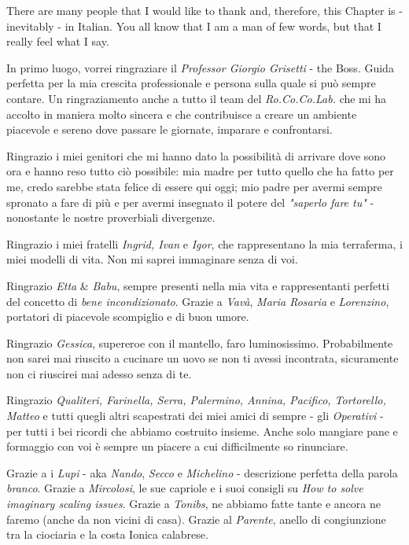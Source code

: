 \newpage

\begin{acknowledgements}
    There are many people that I would like to thank and, therefore, this Chapter is - inevitably - in Italian. You all know that I am a man of few words, but that I really feel what I say.
    
    \vspace{15px}
    
    In primo luogo, vorrei ringraziare il \textit{Professor Giorgio Grisetti} - the Boss. Guida perfetta per la mia crescita professionale e persona sulla quale si può sempre contare. Un ringraziamento anche a tutto il team del \textit{Ro.Co.Co.Lab.} che mi ha accolto in maniera molto sincera e che contribuisce a creare un ambiente piacevole e sereno dove passare le giornate, imparare e confrontarsi.
    
    Ringrazio i miei genitori che mi hanno dato la possibilità di arrivare dove sono ora e hanno reso tutto ciò possibile: mia madre per tutto quello che ha fatto per me, credo sarebbe stata felice di essere qui oggi; mio padre per avermi sempre spronato a fare di più e per avermi insegnato il potere del \textit{"saperlo fare tu"} - nonostante le nostre proverbiali divergenze.
    
    Ringrazio i miei fratelli \textit{Ingrid, Ivan} e \textit{Igor}, che rappresentano la mia terraferma, i miei modelli di vita. Non mi saprei immaginare senza di voi.
    
    Ringrazio \textit{Etta} \& \textit{Babu}, sempre presenti nella mia vita e rappresentanti perfetti del concetto di \textit{bene incondizionato}. Grazie a \textit{Vavà}, \textit{Maria Rosaria} e \textit{Lorenzino}, portatori di piacevole scompiglio e di buon umore. 
    
    Ringrazio \textit{Gessica}, supereroe con il mantello, faro luminosissimo. Probabilmente non sarei mai riuscito a cucinare un uovo se non ti avessi incontrata, sicuramente non ci riuscirei mai adesso senza di te.
    
    Ringrazio \textit{Qualiteri, Farinella, Serra, Palermino, Annina, Pacifico, Tortorello, Matteo} e tutti quegli altri scapestrati dei miei amici di sempre - gli \textit{Operativi}\textsuperscript{\texttrademark} - per tutti i bei ricordi che abbiamo costruito insieme. Anche solo mangiare pane e formaggio con voi è sempre un piacere a cui difficilmente so rinunciare. 
    
    Grazie a i \textit{Lupi}\textsuperscript{\texttrademark} - aka \textit{Nando}, \textit{Secco} e \textit{Michelino} - descrizione perfetta della parola \textit{branco}. Grazie a \textit{Mircolosi}, le sue capriole e i suoi consigli su \textit{How to solve imaginary scaling issues}. Grazie a \textit{Tonibs}, ne abbiamo fatte tante e ancora ne faremo (anche da non vicini di casa). Grazie al \textit{Parente}, anello di congiunzione tra la ciociaria e la costa Ionica calabrese.
    

\end{acknowledgements}
